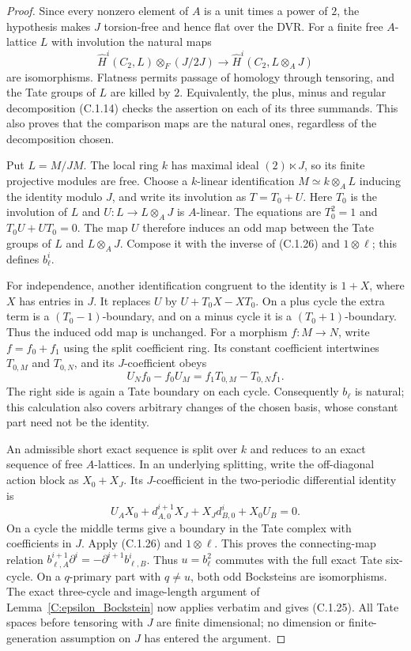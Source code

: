 \begin{proof}
Since every nonzero element of $A$ is a unit times a power of $2$,
the hypothesis makes $J$ torsion-free and hence flat over the DVR.
For a finite free $A$-lattice $L$ with involution the natural maps
\[
 \widehat H^i(C_2,L)\otimes_F(J/2J)
       \longrightarrow \widehat H^i(C_2,L\otimes_AJ)   \tag{C.1.26}
\]
are isomorphisms. Flatness permits passage of homology through
tensoring, and the Tate groups of $L$ are killed by $2$.
Equivalently, the plus, minus and regular decomposition (C.1.14)
checks the assertion on each of its three summands. This also proves
that the comparison maps are the natural ones, regardless of the
decomposition chosen.

Put $L=M/JM$. The local ring $k$ has maximal ideal $(2)\ltimes J$,
so its finite projective modules are free. Choose a $k$-linear
identification $M\simeq k\otimes_A L$ inducing the identity modulo
$J$, and write its involution as $T=T_0+U$. Here $T_0$ is the
involution of $L$ and
$U:L\to L\otimes_AJ$ is $A$-linear. The equations are
$T_0^2=1$ and $T_0U+UT_0=0$.
The map $U$ therefore induces an odd map between the Tate groups
of $L$ and $L\otimes_AJ$. Compose it with the inverse of (C.1.26)
and $1\otimes\ell$; this defines $b_\ell^i$.

For independence, another identification congruent to the identity
is $1+X$, where $X$ has entries in $J$. It replaces $U$ by
$U+T_0X-XT_0$. On a plus cycle the extra term is a
$(T_0-1)$-boundary, and on a minus cycle it is a
$(T_0+1)$-boundary. Thus the induced odd map is unchanged.
For a morphism $f:M\to N$, write $f=f_0+f_1$ using the split
coefficient ring. Its constant coefficient intertwines $T_{0,M}$
and $T_{0,N}$, and its $J$-coefficient obeys
\[
 U_Nf_0-f_0U_M=f_1T_{0,M}-T_{0,N}f_1.
\]
The right side is again a Tate boundary on each cycle. Consequently
$b_\ell$ is natural; this calculation also covers arbitrary changes
of the chosen basis, whose constant part need not be the identity.

An admissible short exact sequence is split over $k$ and reduces to
an exact sequence of free $A$-lattices. In an underlying splitting,
write the off-diagonal action block as $X_0+X_J$. Its $J$-coefficient
in the two-periodic differential identity is
\[
 U_AX_0+d_{A,0}^{i+1}X_J+X_Jd_{B,0}^i+X_0U_B=0.
\]
On a cycle the middle terms give a boundary in the Tate complex
with coefficients in $J$. Apply (C.1.26) and $1\otimes\ell$.
This proves the connecting-map relation
$b_{\ell,A}^{i+1}\partial^i=-\partial^{i+1}b_{\ell,B}^i$.
Thus $u=b_\ell^2$ commutes with the full exact Tate six-cycle.
On a $q$-primary part with $q\ne u$, both odd Bocksteins are
isomorphisms. The exact three-cycle and image-length argument
of Lemma~\ref{C:epsilon_Bockstein} now applies verbatim and gives
(C.1.25). All Tate spaces before tensoring with $J$ are finite
dimensional; no dimension or finite-generation assumption on $J$
has entered the argument.
\end{proof}

